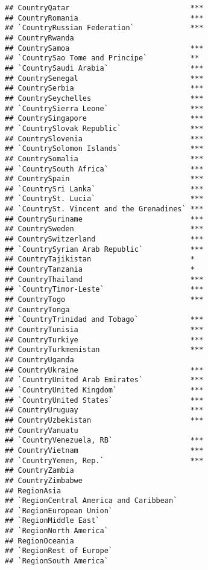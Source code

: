 \documentclass[
]{article}
\begin{document}
\begin{verbatim}
## CountryQatar                            ***
## CountryRomania                          ***
## `CountryRussian Federation`             ***
## CountryRwanda                              
## CountrySamoa                            ***
## `CountrySao Tome and Principe`          ** 
## `CountrySaudi Arabia`                   ***
## CountrySenegal                          ***
## CountrySerbia                           ***
## CountrySeychelles                       ***
## `CountrySierra Leone`                   ***
## CountrySingapore                        ***
## `CountrySlovak Republic`                ***
## CountrySlovenia                         ***
## `CountrySolomon Islands`                ***
## CountrySomalia                          ***
## `CountrySouth Africa`                   ***
## CountrySpain                            ***
## `CountrySri Lanka`                      ***
## `CountrySt. Lucia`                      ***
## `CountrySt. Vincent and the Grenadines` ***
## CountrySuriname                         ***
## CountrySweden                           ***
## CountrySwitzerland                      ***
## `CountrySyrian Arab Republic`           ***
## CountryTajikistan                       *  
## CountryTanzania                         *  
## CountryThailand                         ***
## `CountryTimor-Leste`                    ***
## CountryTogo                             ***
## CountryTonga                               
## `CountryTrinidad and Tobago`            ***
## CountryTunisia                          ***
## CountryTurkiye                          ***
## CountryTurkmenistan                     ***
## CountryUganda                              
## CountryUkraine                          ***
## `CountryUnited Arab Emirates`           ***
## `CountryUnited Kingdom`                 ***
## `CountryUnited States`                  ***
## CountryUruguay                          ***
## CountryUzbekistan                       ***
## CountryVanuatu                             
## `CountryVenezuela, RB`                  ***
## CountryVietnam                          ***
## `CountryYemen, Rep.`                    ***
## CountryZambia                              
## CountryZimbabwe                            
## RegionAsia                                 
## `RegionCentral America and Caribbean`      
## `RegionEuropean Union`                     
## `RegionMiddle East`                        
## `RegionNorth America`                      
## RegionOceania                              
## `RegionRest of Europe`                     
## `RegionSouth America`                      

\end{verbatim}
\end{document}
